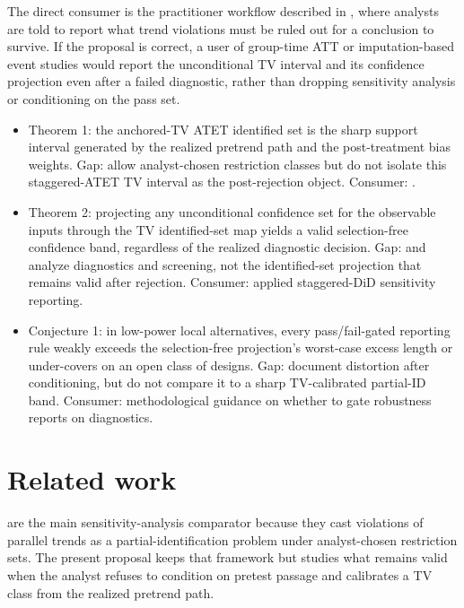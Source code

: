 \documentclass[11pt]{article}
\theoremstyle{definition}
\theoremstyle{plain}
\theoremstyle{remark}
\begin{document}
The direct consumer is the practitioner workflow described in \citet{RothSantAnnaBilinskiPoe2023TrendingDiD}, where analysts are told to report what trend violations must be ruled out for a conclusion to survive. If the proposal is correct, a user of group-time ATT or imputation-based event studies \citep{CallawaySantAnna2021MultiplePeriods,BorusyakJaravelSpiess2024EventStudies} would report the unconditional TV interval and its confidence projection even after a failed diagnostic, rather than dropping sensitivity analysis or conditioning on the pass set.

\begin{itemize}[leftmargin=*]
\item Theorem 1: the anchored-TV ATET identified set is the sharp support interval generated by the realized pretrend path and the post-treatment bias weights. Gap: \citet{RambachanRoth2023CrediblePT} allow analyst-chosen restriction classes but do not isolate this staggered-ATET TV interval as the post-rejection object. Consumer: \citet{RothSantAnnaBilinskiPoe2023TrendingDiD}.
\item Theorem 2: projecting any unconditional confidence set for the observable inputs through the TV identified-set map yields a valid selection-free confidence band, regardless of the realized diagnostic decision. Gap: \citet{Roth2022PretestCaution} and \citet{BilinskiHatfield2026NonInferiority} analyze diagnostics and screening, not the identified-set projection that remains valid after rejection. Consumer: applied staggered-DiD sensitivity reporting.
\item Conjecture 1: in low-power local alternatives, every pass/fail-gated reporting rule weakly exceeds the selection-free projection's worst-case excess length or under-covers on an open class of designs. Gap: \citet{Roth2022PretestCaution} document distortion after conditioning, but do not compare it to a sharp TV-calibrated partial-ID band. Consumer: methodological guidance on whether to gate robustness reports on diagnostics.
\end{itemize}

\section{Related work}
\citet{RambachanRoth2023CrediblePT} are the main sensitivity-analysis comparator because they cast violations of parallel trends as a partial-identification problem under analyst-chosen restriction sets. The present proposal keeps that framework but studies what remains valid when the analyst refuses to condition on pretest passage and calibrates a TV class from the realized pretrend path.
\end{document}
